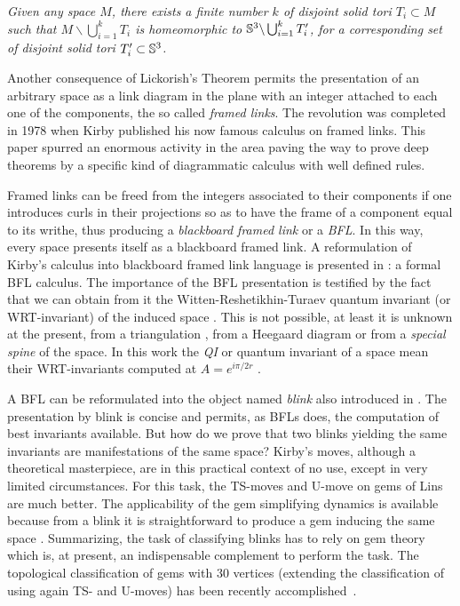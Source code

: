 {\em Given any space $M$, there exists a finite number $k$ of
disjoint solid tori $T_i\subset M$ such that $M \backslash
\bigcup_{i=1}^k T_i$ is homeomorphic to
$\mathbb{S}^3\backslash\bigcup_{i=1}^k T'_i$, for a corresponding set of
disjoint solid tori $T'_i \subset \mathbb{S}^3$.}

Another consequence of Lickorish's Theorem permits the
presentation of an arbitrary space as a link diagram in the plane
with an integer attached to each one of the components, the so
called {\em framed links}. The revolution was completed in 1978 when
Kirby \cite{Kirby1978} published his now famous calculus on framed links.
This paper spurred an enormous activity in the
area paving the way to prove deep theorems by a specific kind of
diagrammatic calculus with well defined rules.

Framed links can be freed from the integers associated to their
components if one introduces curls in their projections so as to
have the frame of a component equal to its writhe, thus producing a
{\em blackboard framed link} or a {\em BFL}. In this way, every
space presents itself as a blackboard framed link. A reformulation
of Kirby's calculus into blackboard framed link language is presented
in \cite{Kauffman1991}: a formal BFL calculus. The importance of the
BFL presentation is
testified by the fact that we can obtain from
it the Witten-Reshetikhin-Turaev quantum invariant (or WRT-invariant) of
the induced space \cite{Witten1989,ReshetikhinAndTuraev1991}. This is
not possible, at least it is unknown at the present, from a
triangulation \cite{Hempel1976}, from a Heegaard diagram
\cite{Rolfsen1976} or from a {\em special spine} \cite{Matveev2003}
of the space. In this work the {\em QI} or quantum invariant of a
space mean their WRT-invariants computed at $A=e^{i\pi/2r}$
\cite{KauffmanAndLins1994}.

A BFL can be reformulated into the object named {\it blink} also
introduced in \cite{KauffmanAndLins1994}. The presentation by blink
is concise and permits, as BFLs does, the computation of best invariants
available. But how do we prove that two blinks yielding the same
invariants are manifestations of the same space? Kirby's moves, although a
theoretical masterpiece, are in this practical context of no use,
except in very limited circumstances. For this task, the TS-moves
and U-move on gems of Lins \cite{Lins1995} are much better. The
applicability of the gem simplifying dynamics is available because
from a blink it is straightforward to produce a gem inducing the
same space \cite{KauffmanAndLins1994}. Summarizing, the task of
classifying blinks has to rely on gem theory which is, at present,
an indispensable complement to perform the task. The topological
classification of gems with 30 vertices (extending the classification
of \cite{Lins1995} using again TS- and U-moves) has been recently
accomplished~\cite{CasaliCrist2006}.

